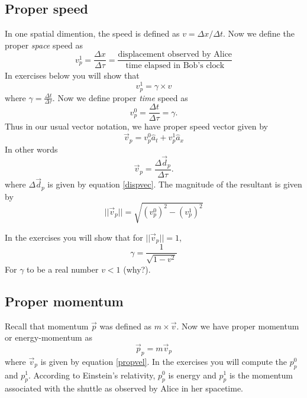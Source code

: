 \documentclass[10pt]{article}
\begin{document}
\subsection{Proper speed}
In one spatial dimention, the speed is defined as $v=\Delta x/\Delta t$.  Now we define the proper \emph{space} speed as
\begin{equation}
\label{propspspeeddef}
  v_p^1=\frac{\Delta x}{\Delta \tau}=\frac{\text{displacement observed by Alice}}{\text{time elapsed in Bob's clock}}
\end{equation}
In exercises below you will show that
\begin{equation}
\label{propspspeed}
  v_p^1=\gamma\times v
\end{equation}
where $\gamma = \frac{\Delta t}{\Delta \tau}$.
Now we define proper \emph{time} speed as
\begin{equation}
  v_p^0=\frac{\Delta t}{\Delta \tau}=\gamma.
\end{equation}
Thus in our usual vector notation, we have proper speed vector given by
\begin{equation}
\label{propvel}
  \vec{v}_p=v_p^0\hat{a}_t+v_p^1\hat{a}_x
\end{equation}
In other words 
\begin{equation}
\vec{v}_p=\frac{\Delta \vec{d}_p}{\Delta \tau}.  
\end{equation}
where $\Delta \vec{d}_p$ is given by equation \ref{dispvec}.  The magnitude of the resultant is given by 
\begin{equation}
  ||\vec{v}_p|| = \sqrt{(v_p^0)^2-(v_p^1)^2}
\end{equation}

In the exercises you will show that for $||\vec{v}_p||=1$, 
\begin{equation}
\label{gammafind}
  \gamma = \frac{1}{\sqrt{1-v^2}}
\end{equation}
For $\gamma$ to be a real number $v<1$ (why?).

\subsection{Proper momentum}
\label{promom}
Recall that momentum $\vec{p}$ was defined as $m\times\vec{v}$.  Now we have proper momentum or energy-momentum as
\begin{equation}
\label{propmomdef}
  \vec{p}_p=m\vec{v}_p
\end{equation}
where $\vec{v}_p$ is given by equation \ref{propvel}.  In the exercises you will compute the $p_p^0$ and $p_p^1$.  According to Einstein's relativity, $p_p^0$ is energy and $p_p^1$ is the momentum associated with the shuttle as observed by Alice in her spacetime.
\end{document}
